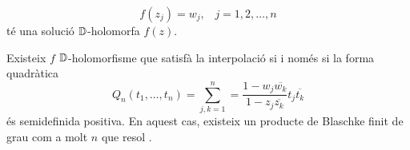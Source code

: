 \documentclass[dvipsnames, svgnames, leqno, a4paper, 12pt]{article}
\begin{document}
\begin{equation}\label{eq:interpol}
    f(z_j)=w_j,\, \text{  } j=1,2,\dots,n
\end{equation}
%
té una solució $\mathbb{D}$-holomorfa $f(z)$.

\begin{theorem}[Pick]
    Existeix $f$ $\mathbb{D}$-holomorfisme que satisfà la interpolació \normalfont{(\ref{eq:interpol})} si i només si la forma quadràtica 
    \begin{displaymath}
        Q_n(t_1,\dots,t_n)=\sum_{j,k=1}^n=\frac{1-w_j\overline{w_k}}{1-z_j\overline{z_k}}t_j\overline{t_k}
    \end{displaymath}
    és semidefinida positiva. En aquest cas, existeix un producte de Blaschke finit de grau com a molt $n$ que resol \normalfont{(\ref{eq:interpol})}.
\end{theorem}
\end{document}
